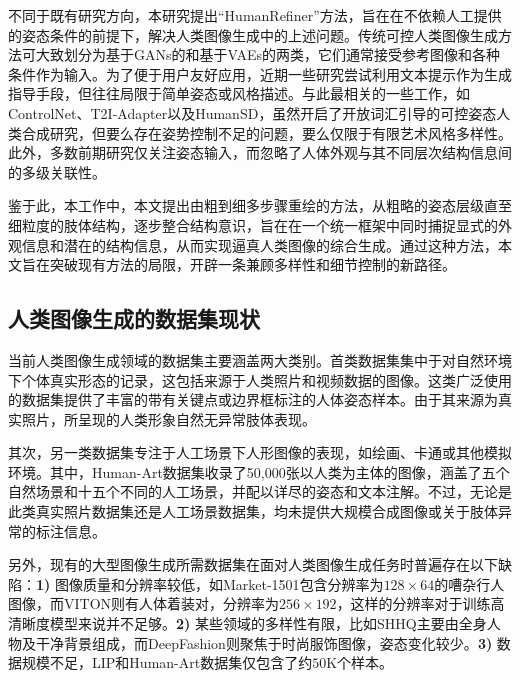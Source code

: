 不同于既有研究方向，本研究提出“HumanRefiner”方法，旨在在不依赖人工提供的姿态条件的前提下，解决人类图像生成中的上述问题。传统可控人类图像生成方法可大致划分为基于GANs的\cite{zhu2017your, siarohin2019appearance}和基于VAEs的\cite{ren2020deep, yang2021towards}两类，它们通常接受参考图像和各种条件作为输入。为了便于用户友好应用，近期一些研究尝试利用文本提示作为生成指导手段\cite{roy2022tips, jiang2022text2human}，但往往局限于简单姿态或风格描述。与此最相关的一些工作，如ControlNet\cite{zhang2023adding}、T2I-Adapter\cite{mou2023t2i}以及HumanSD\cite{ju2023humansd}，虽然开启了开放词汇引导的可控姿态人类合成研究，但要么存在姿势控制不足的问题，要么仅限于有限艺术风格多样性。此外，多数前期研究仅关注姿态输入，而忽略了人体外观与其不同层次结构信息间的多级关联性。

鉴于此，本工作中，本文提出由粗到细多步骤重绘的方法，从粗略的姿态层级直至细粒度的肢体结构，逐步整合结构意识，旨在在一个统一框架中同时捕捉显式的外观信息和潜在的结构信息，从而实现逼真人类图像的综合生成。通过这种方法，本文旨在突破现有方法的局限，开辟一条兼顾多样性和细节控制的新路径。

\subsection{人类图像生成的数据集现状}

当前人类图像生成领域的数据集主要涵盖两大类别。首类数据集集中于对自然环境下个体真实形态的记录，这包括来源于人类照片和视频数据的图像\cite{MSCOCO_lin2014microsoft, schuhmann2022laion, Pose2Seg_zhang2019pose2seg, HandDetec_narasimhaswamy2022whose, CrowdPose_li2019crowdpose, Posetrack_andriluka2018posetrack, Yutubepose_charles2016personalizing, open_pose_cao2017realtime}。这类广泛使用的数据集提供了丰富的带有关键点或边界框标注的人体姿态样本。由于其来源为真实照片，所呈现的人类形象自然无异常肢体表现。

其次，另一类数据集专注于人工场景下人形图像的表现，如绘画、卡通或其他模拟环境。其中，Human-Art数据集\cite{ju2023humanART}收录了50,000张以人类为主体的图像，涵盖了五个自然场景和十五个不同的人工场景，并配以详尽的姿态和文本注解。不过，无论是此类真实照片数据集还是人工场景数据集，均未提供大规模合成图像或关于肢体异常的标注信息。

另外，现有的大型图像生成所需数据集在面对人类图像生成任务时普遍存在以下缺陷：\textbf{1)} 图像质量和分辨率较低，如Market-1501\cite{zheng2015scalable}包含分辨率为$128 \times 64$的嘈杂行人图像，而VITON\cite{han2018viton}则有人体着装对，分辨率为$256 \times 192$，这样的分辨率对于训练高清晰度模型来说并不足够。\textbf{2)} 某些领域的多样性有限，比如SHHQ\cite{fu2022stylegan}主要由全身人物及干净背景组成，而DeepFashion\cite{liu2016deepfashion}则聚焦于时尚服饰图像，姿态变化较少。\textbf{3)} 数据规模不足，LIP\cite{gong2017look}和Human-Art\cite{ju2023human}数据集仅包含了约$50\mathrm{K}$个样本。


